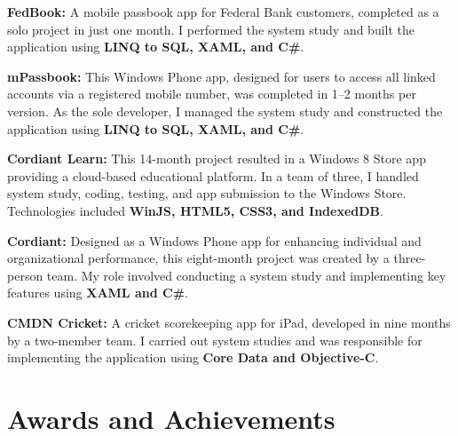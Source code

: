 \documentclass[10pt, letterpaper]{article}
\begin{document}
\noindent \textbf{FedBook:} 
A mobile passbook app for Federal Bank customers, completed as a solo project in just one month. I performed the system study and built the application using\textbf{ LINQ to SQL, XAML, and C\#}.

\noindent \textbf{mPassbook:} 
This Windows Phone app, designed for users to access all linked accounts via a registered mobile number, was completed in 1--2 months per version. As the sole developer, I managed the system study and constructed the application using \textbf{LINQ to SQL, XAML, and C\#}.

\noindent \textbf{Cordiant Learn:} 
This 14-month project resulted in a Windows 8 Store app providing a cloud-based educational platform. In a team of three, I handled system study, coding, testing, and app submission to the Windows Store. Technologies included \textbf{WinJS, HTML5, CSS3, and IndexedDB}.

\noindent \textbf{Cordiant:} 
Designed as a Windows Phone app for enhancing individual and organizational performance, this eight-month project was created by a three-person team. My role involved conducting a system study and implementing key features using\textbf{ XAML and C\#}.

\noindent \textbf{CMDN Cricket:}  
A cricket scorekeeping app for iPad, developed in nine months by a two-member team. I carried out system studies and was responsible for implementing the application using \textbf{Core Data and Objective-C}.

\section*{Awards and Achievements}
\end{document}
